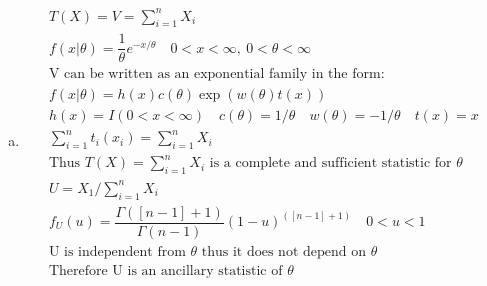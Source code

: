 \documentclass{article}
\begin{document}
\begin{flushleft}
\begin{enumerate}[(a)]
	\item 
\begin{multline*}\\
T(X)=V=\sum_{i=1}^{n}X_i\\
f(x|\theta)=\dfrac{1}{\theta}e^{-x/\theta} \quad 0<x<\infty, \ 0<\theta<\infty\\
\text{V can be written as an exponential family in the form:}\\
f(x|\theta)=h(x)c(\theta)\exp\left(w(\theta)t(x) \right)\\
h(x)=I(0<x<\infty) \quad c(\theta)=1/\theta \quad w(\theta)=-1/\theta \quad t(x)=x\\
\sum_{i=1}^{n}t_i(x_i)=\sum_{i=1}^{n}X_i\\
\text{Thus } T(X)=\sum_{i=1}^{n}X_i \text{ is a complete and sufficient statistic for } \theta\\
U=X_1/\sum_{i=1}^{n}X_i\\
f_U(u)=\dfrac{\Gamma([n-1]+1)}{\Gamma(n-1)}{(1-u)}^{([n-1]+1)} \quad 0<u<1\\
\text{U is independent from } \theta \text{ thus it does not depend on } \theta\\
\text{Therefore U is an ancillary statistic of } \theta\\ 
\end{multline*}


\end{enumerate}
\end{flushleft}
\end{document}
